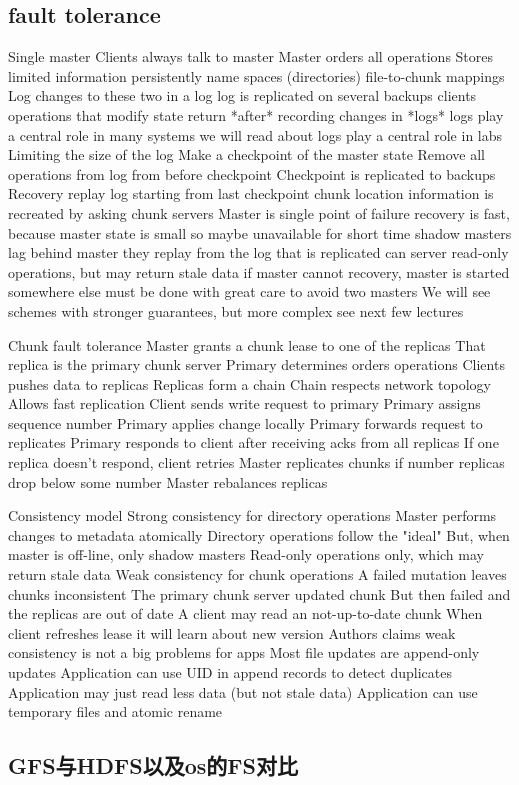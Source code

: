 \subsection{fault tolerance}
  Single master
    Clients always talk to master
    Master orders all operations
  Stores limited information persistently
    name spaces (directories)
    file-to-chunk mappings
  Log changes to these two in a log
    log is replicated on several backups
    clients operations that modify state return *after* recording changes in *logs*
    logs play a central role in many systems we will read about
    logs play a central role in labs
  Limiting the size of the log
    Make a checkpoint of the master state
    Remove all operations from log from before checkpoint
    Checkpoint is replicated to backups
  Recovery
    replay log starting from last checkpoint
    chunk location information is recreated by asking chunk servers
  Master is single point of failure
    recovery is fast, because master state is small
      so maybe unavailable for short time
    shadow masters
      lag behind master
        they replay from the log that is replicated
      can server read-only operations, but may return stale data
    if master cannot recovery, master is started somewhere else
    must be done with great care to avoid two masters
  We will see schemes with stronger guarantees, but more complex
    see next few lectures

Chunk fault tolerance
  Master grants a chunk lease to one of the replicas
    That replica is the primary chunk server
  Primary determines orders operations
  Clients pushes data to replicas
    Replicas form a chain
    Chain respects network topology
    Allows fast replication
  Client sends write request to primary
    Primary assigns sequence number
    Primary applies change locally
    Primary forwards request to replicates
    Primary responds to client after receiving acks from all replicas
  If one replica doesn't respond, client retries
  Master replicates chunks if number replicas drop below some number
  Master rebalances replicas
  
  Consistency model
  Strong consistency for directory operations
    Master performs changes to metadata atomically
    Directory operations follow the "ideal"
    But, when master is off-line, only shadow masters
      Read-only operations only, which may return stale data
  Weak consistency for chunk operations
    A failed mutation leaves chunks inconsistent
      The primary chunk server updated chunk
      But then failed and the replicas are out of date
    A client may read an not-up-to-date chunk
    When client refreshes lease it will learn about new version 
  Authors claims weak consistency is not a big problems for apps    
    Most file updates are append-only updates
      Application can use UID in append records to detect duplicates
      Application may just read less data (but not stale data)
    Application can use temporary files and atomic rename
\subsection{GFS与HDFS以及os的FS对比}
